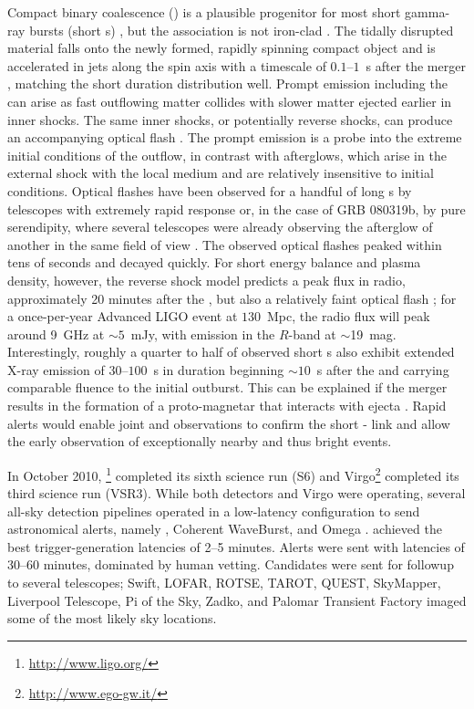 Compact binary coalescence (\CBC{}) is a plausible progenitor for most short
gamma-ray bursts (short \GRB{}s) \citep{Lee:2005, nakar07}, but the
association is not iron-clad \citep{2011ApJ...727..109V}. The tidally
disrupted material falls onto the newly formed, rapidly spinning compact object
and is accelerated in jets along the spin axis with a timescale of
$0.1$--$1$~s after the merger \citep{Janka1999}, matching the short \GRB{}
duration distribution well. Prompt \EM{} emission including the \GRB{}
can arise as fast outflowing
matter collides with slower matter ejected earlier in inner shocks. The same
inner shocks, or potentially reverse shocks, can produce an accompanying
optical flash \citep{Sari99}. The prompt emission is a probe into the extreme
initial conditions of the outflow, in contrast with afterglows, which arise in
the external shock with the local medium and are relatively insensitive to
initial conditions. Optical flashes have been observed for a handful of long
\GRB{}s \citep{2011CRPhy..12..255A} by telescopes with extremely rapid response
or, in the case of GRB 080319b, by pure serendipity, where several
telescopes were already observing the afterglow of another \GRB{} in the same
field of view \citep{2008Natur.455..183R}. The observed optical flashes peaked
within tens of seconds and decayed quickly. For short \GRB{} energy balance and
plasma density,
however, the reverse shock model predicts a peak flux in radio, approximately
20 minutes after the \GRB{}, but also a relatively faint optical flash
\citep{nakar07}; for a once-per-year Advanced LIGO event at $130$~Mpc, the
radio flux will peak around 9~GHz at $\sim$$5$~mJy, with emission in the
$R$-band at $\sim$19~mag. Interestingly, roughly a quarter to half of observed short
\GRB{}s also exhibit extended X-ray emission of $30$--$100$~s in duration
beginning $\sim$$10$~s after the \GRB{} and carrying comparable fluence to the
initial outburst. This can be explained if the merger results in the formation
of a proto-magnetar that interacts with ejecta \citep{Bucciantini2011}. Rapid
\GW{} alerts would enable joint \EM{} and \GW{} observations to confirm
the short \GRB{}-\CBC{} link and allow the early \EM{}
observation of exceptionally nearby and thus bright events.

In October 2010, \LIGO{}\footnote{\url{http://www.ligo.org/}} completed its
sixth science run (S6) and Virgo\footnote{\url{http://www.ego-gw.it/}}
completed its third science run (VSR3).  While both \LIGO{} detectors and Virgo
were operating, several all-sky detection pipelines operated in a low-latency
configuration to send astronomical alerts, namely \mbta{}, Coherent
WaveBurst, and Omega \citep{HugheyGWPAW2011, S6lowlatency2, S6lowlatency3, S6lowlatency4}.
\mbta{} achieved the best \GW{} trigger-generation latencies of 2--5 minutes.
Alerts were sent with latencies of 30--60 minutes, dominated by human vetting.
Candidates were sent for \EM{} followup to several telescopes; Swift,
LOFAR, ROTSE, TAROT, QUEST, SkyMapper,
Liverpool Telescope, Pi of the Sky, Zadko, and Palomar Transient Factory
\citep{kanner2008, HugheyGWPAW2011} imaged some of the most likely sky
locations.

